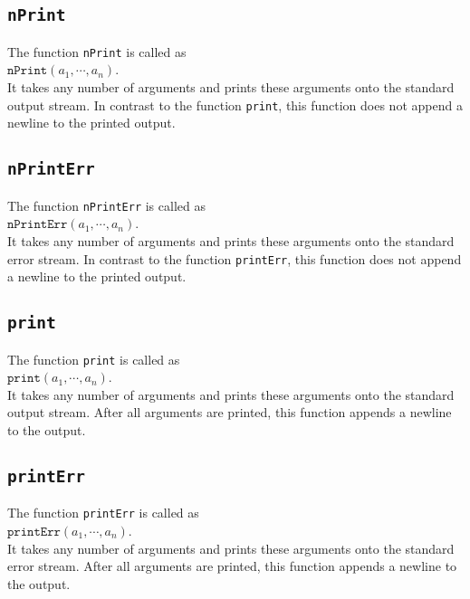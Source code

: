 \subsection{\texttt{nPrint}}
The function \texttt{nPrint}  is called as
\\[0.2cm]
\hspace*{1.3cm}
$\mathtt{nPrint}(a_1, \cdots, a_n)$.
\\[0.2cm]
It takes any number of arguments and prints these arguments onto the standard output
stream.  In contrast to the function
\texttt{print}, this function does not append a newline to the printed output.

\subsection{\texttt{nPrintErr}}
The function \texttt{nPrintErr}  is called as
\\[0.2cm]
\hspace*{1.3cm}
$\mathtt{nPrintErr}(a_1, \cdots, a_n)$.
\\[0.2cm]
It takes any number of arguments and prints these arguments onto the standard error
stream.  In contrast to the function
\texttt{printErr}, this function does not append a newline to the printed output.

\subsection{\texttt{print}}
The function \texttt{print}  is called as
\\[0.2cm]
\hspace*{1.3cm}
$\mathtt{print}(a_1, \cdots, a_n)$.
\\[0.2cm]
It takes any number of arguments and prints these arguments onto the standard output
stream.  After all arguments are
printed, this function appends a newline to the output.

\subsection{\texttt{printErr}}
The function \texttt{printErr}  is called as
\\[0.2cm]
\hspace*{1.3cm}
$\mathtt{printErr}(a_1, \cdots, a_n)$.
\\[0.2cm]
It takes any number of arguments and prints these arguments onto the standard error
stream.  After all arguments are
printed, this function appends a newline to the output.

